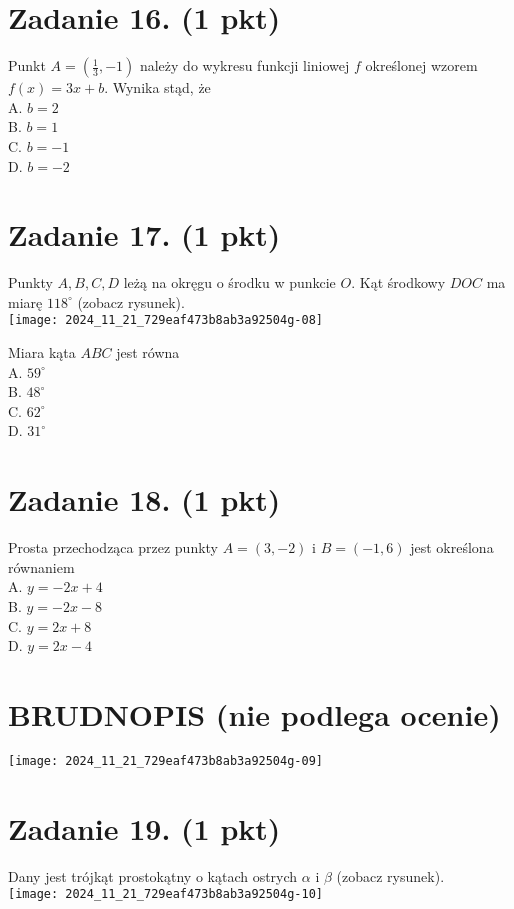 \documentclass[10pt]{article}
\begin{document}
\section*{Zadanie 16. (1 pkt)}
Punkt \(A=\left(\frac{1}{3},-1\right)\) należy do wykresu funkcji liniowej \(f\) określonej wzorem \(f(x)=3 x+b\). Wynika stąd, że\\
A. \(b=2\)\\
B. \(b=1\)\\
C. \(b=-1\)\\
D. \(b=-2\)

\section*{Zadanie 17. (1 pkt)}
Punkty \(A, B, C, D\) leżą na okręgu o środku w punkcie \(O\). Kąt środkowy \(D O C\) ma miarę \(118^{\circ}\) (zobacz rysunek).\\
\texttt{[image: 2024\_11\_21\_729eaf473b8ab3a92504g-08]}

Miara kąta \(A B C\) jest równa\\
A. \(59^{\circ}\)\\
B. \(48^{\circ}\)\\
C. \(62^{\circ}\)\\
D. \(31^{\circ}\)

\section*{Zadanie 18. (1 pkt)}
Prosta przechodząca przez punkty \(A=(3,-2)\) i \(B=(-1,6)\) jest określona równaniem\\
A. \(y=-2 x+4\)\\
B. \(y=-2 x-8\)\\
C. \(y=2 x+8\)\\
D. \(y=2 x-4\)

\section*{BRUDNOPIS (nie podlega ocenie)}
\begin{center}
\texttt{[image: 2024\_11\_21\_729eaf473b8ab3a92504g-09]}
\end{center}

\section*{Zadanie 19. (1 pkt)}
Dany jest trójkąt prostokątny o kątach ostrych \(\alpha\) i \(\beta\) (zobacz rysunek).\\
\texttt{[image: 2024\_11\_21\_729eaf473b8ab3a92504g-10]}
\end{document}

